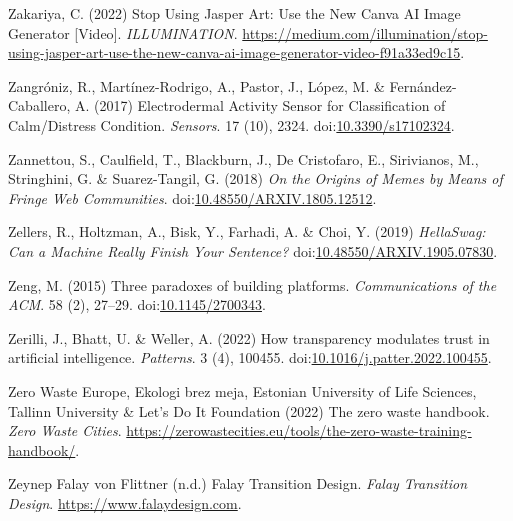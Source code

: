 \documentclass[
  letterpaper,
  DIV=11,
  numbers=noendperiod]{scrartcl}
\newlength{\cslhangindent}
\newenvironment{CSLReferences}[2] %
 {\begin{list}{}{%
  \setlength{\itemindent}{0pt}
  \setlength{\leftmargin}{0pt}
  \setlength{\parsep}{0pt}
  \ifodd #1
   \setlength{\leftmargin}{\cslhangindent}
   \setlength{\itemindent}{-1\cslhangindent}
  \fi
  \setlength{\itemsep}{#2\baselineskip}}}
 {\end{list}}
\begin{document}
\begin{CSLReferences}{0}{1}
Zakariya, C. (2022) Stop {Using Jasper Art}: {Use} the {New Canva AI
Image Generator} {[}{Video}{]}. \emph{ILLUMINATION}.
\url{https://medium.com/illumination/stop-using-jasper-art-use-the-new-canva-ai-image-generator-video-f91a33ed9c15}.

Zangróniz, R., Martínez-Rodrigo, A., Pastor, J., López, M. \&
Fernández-Caballero, A. (2017) Electrodermal {Activity Sensor} for
{Classification} of {Calm}/{Distress Condition}. \emph{Sensors}. 17
(10), 2324.
doi:\href{https://doi.org/10.3390/s17102324}{10.3390/s17102324}.

Zannettou, S., Caulfield, T., Blackburn, J., De Cristofaro, E.,
Sirivianos, M., Stringhini, G. \& Suarez-Tangil, G. (2018) \emph{On the
{Origins} of {Memes} by {Means} of {Fringe Web Communities}}.
doi:\href{https://doi.org/10.48550/ARXIV.1805.12512}{10.48550/ARXIV.1805.12512}.

Zellers, R., Holtzman, A., Bisk, Y., Farhadi, A. \& Choi, Y. (2019)
\emph{{HellaSwag}: {Can} a {Machine Really Finish Your Sentence}?}
doi:\href{https://doi.org/10.48550/ARXIV.1905.07830}{10.48550/ARXIV.1905.07830}.

Zeng, M. (2015) Three paradoxes of building platforms.
\emph{Communications of the ACM}. 58 (2), 27--29.
doi:\href{https://doi.org/10.1145/2700343}{10.1145/2700343}.

Zerilli, J., Bhatt, U. \& Weller, A. (2022) How transparency modulates
trust in artificial intelligence. \emph{Patterns}. 3 (4), 100455.
doi:\href{https://doi.org/10.1016/j.patter.2022.100455}{10.1016/j.patter.2022.100455}.

Zero Waste Europe, Ekologi brez meja, Estonian University of Life
Sciences, Tallinn University \& Let's Do It Foundation (2022) The zero
waste handbook. \emph{Zero Waste Cities}.
\url{https://zerowastecities.eu/tools/the-zero-waste-training-handbook/}.

Zeynep Falay von Flittner (n.d.) Falay {Transition Design}. \emph{Falay
Transition Design}. \url{https://www.falaydesign.com}.


\end{CSLReferences}
\end{document}
